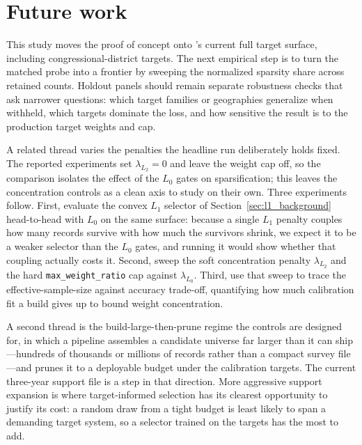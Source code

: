 \section{Future work}
\label{sec:future_work}

This study moves the proof of concept onto \populace{}'s current full target surface, including
congressional-district targets. The next empirical step is to turn the matched probe into a frontier by
sweeping the normalized sparsity share across retained counts. Holdout panels should remain separate
robustness checks that ask narrower
questions: which target families or geographies generalize when withheld, which targets dominate the loss,
and how sensitive the result is to the production target weights and cap.

A related thread varies the penalties the headline run deliberately holds fixed. The reported experiments
set $\lambda_{L_2}=0$ and leave the weight cap off, so the comparison isolates the effect of the $L_0$
gates on sparsification; this leaves the concentration controls as a clean axis to study on their own.
Three experiments follow. First, evaluate the convex $L_1$ selector of Section~\ref{sec:l1_background}
head-to-head with $L_0$ on the same surface: because a single $L_1$ penalty couples how many records
survive with how much the survivors shrink, we expect it to be a weaker selector than the $L_0$ gates,
and running it would show whether that coupling actually costs it. Second, sweep the soft concentration
penalty $\lambda_{L_2}$ and the hard \texttt{max\_weight\_ratio} cap against $\lambda_{L_0}$. Third, use
that sweep to trace the effective-sample-size against accuracy trade-off, quantifying how much calibration
fit a build gives up to bound weight concentration.

A second thread is the build-large-then-prune regime the controls are designed for, in which a pipeline
assembles a candidate universe far larger than it can ship---hundreds of thousands or millions of records
rather than a compact survey file---and prunes it to a deployable budget under the calibration targets.
The current three-year support file is a step in that direction. More aggressive support expansion is
where target-informed selection has its clearest opportunity to justify its cost: a random draw from a
tight budget is least likely to span a demanding target system, so a selector trained on the targets has
the most to add.

